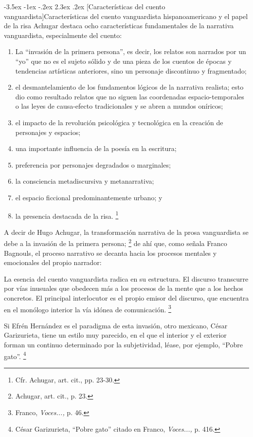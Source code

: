 \documentclass[14pt,twoside,final]{extbook} %
\makeatletter
\let\oldfootnote\footnote
\renewcommand\footnote[1]{%
\oldfootnote{\hspace{1mm}#1}}
\renewcommand\section{\@startsection {section}{1}{\z@}%
                                     {-3.5ex \@plus -1ex \@minus -.2ex}%
                                     {2.3ex \@plus .2ex}%
                                     {\normalfont\large\bfseries\sc}}
\makeatother
\begin{document}
\section[Características del cuento vanguardista]{Características del cuento vanguardista hispanoamericano y el papel de la risa}\label{sec:caracteristicas-del-cuento-vanguardista-hispanoamericano-y-el-papel-de-la-risa}\protect\enlargethispage*{\baselineskip}
Achugar destaca ocho características fundamentales de la narrativa vanguardista, especialmente del cuento:
\begin{enumerate}[noitemsep]
\item La ``invasión de la primera persona'', es decir, los relatos son narrados por un ``yo'' que no es el sujeto sólido y de una pieza de los cuentos de épocas y tendencias artísticas anteriores, sino un personaje discontinuo y fragmentado;
\item el desmantelamiento de los fundamentos lógicos de la narrativa realista; esto dio como resultado relatos que no siguen las coordenadas espacio-temporales o las leyes de causa-efecto tradicionales y se abren a mundos oníricos;
\item el impacto de la revolución psicológica y tecnológica en la creación de personajes y espacios;
\item una importante influencia de la poesía en la escritura;
\item preferencia por personajes degradados o marginales;
\item la consciencia metadiscursiva y metanarrativa;
\item el espacio ficcional predominantemente urbano; y
\item la presencia destacada de la risa.\footnote{Cfr. Achugar, art. cit., pp. 23-30.}
\end{enumerate}
A decir de Hugo Achugar, la transformación narrativa de la prosa vanguardista se debe a la invasión de la primera persona;\footnote{Achugar, art. cit., p. 23.} de ahí que, como señala Franco Bagnouls, el proceso narrativo se decanta hacia los procesos mentales y emocionales del propio narrador: 
\begin{quoting}
La esencia del cuento vanguardista radica en su estructura. El discurso transcurre por vías inusuales que obedecen más a los procesos de la mente que a los hechos concretos. El principal interlocutor es el propio emisor del discurso, que encuentra en el monólogo interior la vía idónea de comunicación.\footnote{Franco, \emph{Voces...,} p. 46.}
\end{quoting}
Si Efrén Hernández es el paradigma de esta invasión, otro mexicano, César Garizurieta, tiene un estilo muy parecido, en el que el interior y el exterior forman un continuo determinado por la subjetividad, léase, por ejemplo, ``Pobre gato''.\footnote{César Garizurieta, ``Pobre gato'' citado en Franco, \emph{Voces...,} p. 416.}
\end{document}
